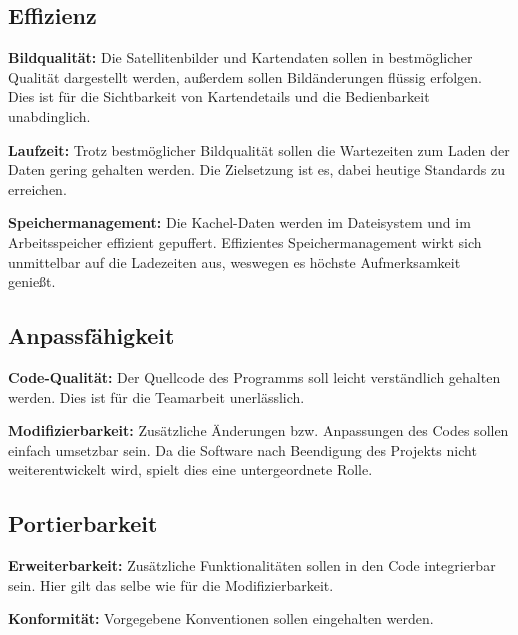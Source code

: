 \documentclass[10pt]{scrreprt}
\newenvironment{indents}{%
  \parskip6pt \parindent5mm \raggedright%
  \def\item{\hangindent=5mm \hangafter1}}{%
  \par\ignorespaces}
\begin{document}
\subsection*{Effizienz}
\begin{indents}
\item \textbf{Bildqualität:} Die Satellitenbilder und Kartendaten sollen in bestmöglicher Qualität dargestellt werden, außerdem sollen Bildänderungen flüssig erfolgen. Dies ist für die Sichtbarkeit von Kartendetails und die Bedienbarkeit unabdinglich.

\item \textbf{Laufzeit:} Trotz bestmöglicher Bildqualität sollen die Wartezeiten zum Laden der Daten gering gehalten werden. Die Zielsetzung ist es, dabei heutige Standards zu erreichen.

\item \textbf{Speichermanagement:} Die Kachel-Daten werden im Dateisystem und im Arbeitsspeicher effizient gepuffert. Effizientes Speichermanagement wirkt sich unmittelbar auf die Ladezeiten aus, weswegen es höchste Aufmerksamkeit genießt.
\end{indents}


\subsection*{Anpassfähigkeit}
\begin{indents}
\item \textbf{Code-Qualität:} Der Quellcode des Programms soll leicht verständlich gehalten werden. Dies ist für die Teamarbeit unerlässlich.

\item \textbf{Modifizierbarkeit:} Zusätzliche Änderungen bzw. Anpassungen des Codes sollen einfach umsetzbar sein. Da die Software nach Beendigung des Projekts nicht weiterentwickelt wird, spielt dies eine untergeordnete Rolle.
\end{indents}


\subsection*{Portierbarkeit}
\begin{indents}
\item \textbf{Erweiterbarkeit:} Zusätzliche Funktionalitäten sollen in den Code integrierbar sein. Hier gilt das selbe wie für die Modifizierbarkeit.

\item \textbf{Konformität:} Vorgegebene Konventionen sollen eingehalten werden. 
\end{indents}
\end{document}

